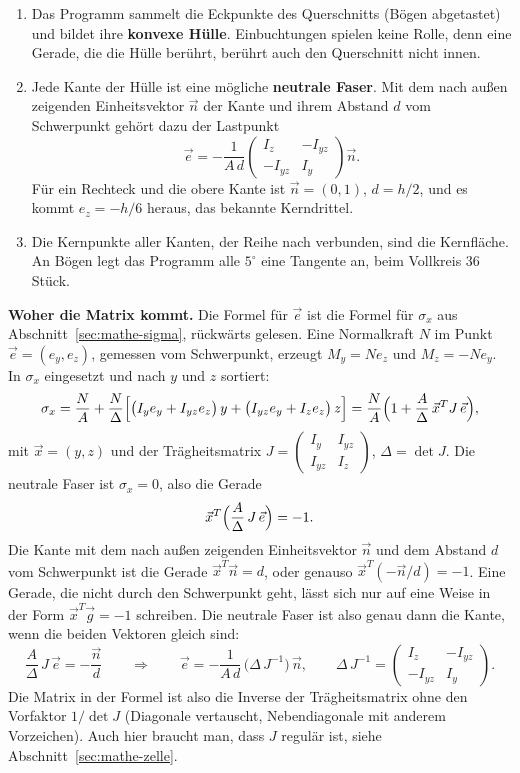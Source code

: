\begin{enumerate}
  \item Das Programm sammelt die Eckpunkte des Querschnitts (Bögen abgetastet) und bildet ihre
        \textbf{konvexe Hülle}. Einbuchtungen spielen keine Rolle, denn eine Gerade, die die Hülle
        berührt, berührt auch den Querschnitt nicht innen.
  \item Jede Kante der Hülle ist eine mögliche \textbf{neutrale Faser}. Mit dem nach außen
        zeigenden Einheitsvektor $\vec n$ der Kante und ihrem Abstand $d$ vom Schwerpunkt gehört
        dazu der Lastpunkt
        \[
          \vec e = -\frac{1}{A\,d}
          \begin{pmatrix} I_z & -I_{yz} \\ -I_{yz} & I_y \end{pmatrix} \vec n .
        \]
        Für ein Rechteck und die obere Kante ist $\vec n = (0,1)$, $d = h/2$, und es kommt
        $e_z = -h/6$ heraus, das bekannte Kerndrittel.
  \item Die Kernpunkte aller Kanten, der Reihe nach verbunden, sind die Kernfläche. An Bögen legt
        das Programm alle $5^\circ$ eine Tangente an, beim Vollkreis 36 Stück.
\end{enumerate}

\textbf{Woher die Matrix kommt.} Die Formel für $\vec e$ ist die Formel für $\sigma_x$ aus
Abschnitt~\ref{sec:mathe-sigma}, rückwärts gelesen. Eine Normalkraft $N$ im Punkt
$\vec e = (e_y, e_z)$, gemessen vom Schwerpunkt, erzeugt $M_y = N e_z$ und $M_z = -N e_y$. In
$\sigma_x$ eingesetzt und nach $y$ und $z$ sortiert:
\[
  \sigma_x = \frac NA + \frac N\Delta\Bigl[\bigl(I_y e_y + I_{yz} e_z\bigr)\,y
                                       + \bigl(I_{yz} e_y + I_z e_z\bigr)\,z\Bigr]
           = \frac NA\Bigl(1 + \frac A\Delta\,\vec x^T J\,\vec e\Bigr) ,
\]
mit $\vec x = (y, z)$ und der Trägheitsmatrix $J = \begin{pmatrix} I_y & I_{yz} \\ I_{yz} & I_z
\end{pmatrix}$, $\Delta = \det J$. Die neutrale Faser ist $\sigma_x = 0$, also die Gerade
\[
  \vec x^T \Bigl(\frac A\Delta\,J\,\vec e\Bigr) = -1 .
\]
Die Kante mit dem nach außen zeigenden Einheitsvektor $\vec n$ und dem Abstand $d$ vom Schwerpunkt
ist die Gerade $\vec x^T \vec n = d$, oder genauso $\vec x^T(-\vec n/d) = -1$. Eine Gerade, die
nicht durch den Schwerpunkt geht, lässt sich nur auf eine Weise in der Form $\vec x^T \vec g = -1$
schreiben. Die neutrale Faser ist also genau dann die Kante, wenn die beiden Vektoren gleich sind:
\[
  \frac A\Delta\,J\,\vec e = -\frac{\vec n}{d}
  \qquad\Longrightarrow\qquad
  \vec e = -\frac{1}{A\,d}\,\bigl(\Delta\,J^{-1}\bigr)\,\vec n ,
  \qquad
  \Delta\,J^{-1} = \begin{pmatrix} I_z & -I_{yz} \\ -I_{yz} & I_y \end{pmatrix} .
\]
Die Matrix in der Formel ist also die Inverse der Trägheitsmatrix ohne den Vorfaktor $1/\det J$
(Diagonale vertauscht, Nebendiagonale mit anderem Vorzeichen). Auch hier braucht man, dass $J$
regulär ist, siehe Abschnitt~\ref{sec:mathe-zelle}.

